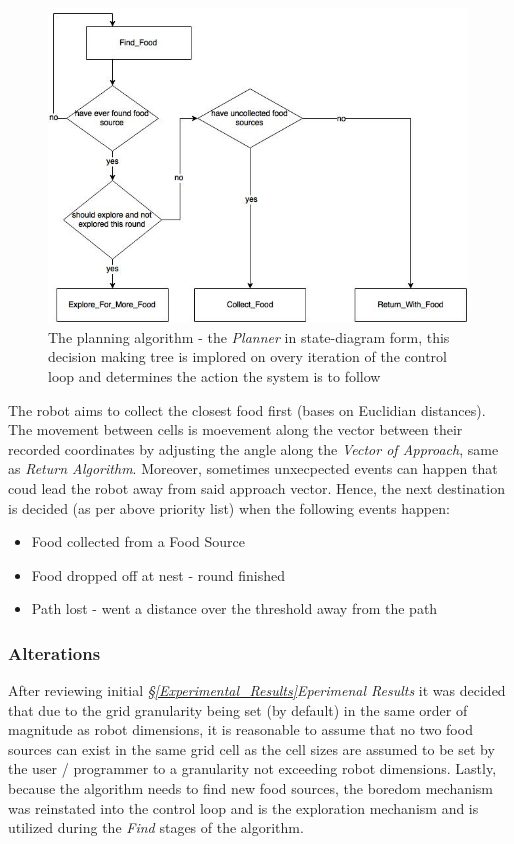 \documentclass[11pt, a4paper]{article}
\begin{document}
\begin{figure}[H]
	  \caption{The planning algorithm - the \textit{Planner} in state-diagram form, this decision making tree is implored on overy iteration of the control loop and determines the action the system is to follow}
 	  \centering
	  \includegraphics[width=30em]{../assets/fig_planner.jpg}
\end{figure} 

The robot aims to collect the closest food first (bases on Euclidian distances). The movement between cells is moevement along the vector between their recorded coordinates by adjusting the angle along the \textit{Vector of Approach}, same as \textit{Return Algorithm}\cite{task2_report}. Moreover, sometimes unxecpected events can happen that coud lead the robot away from said approach vector. Hence, the next destination is decided (as per above priority list) when the following events happen:

\begin{itemize}

	\item Food collected from a Food Source
	\item Food dropped off at nest - round finished
	\item Path lost - went a distance over the threshold away from the path

\end{itemize}

\subsubsection{Alterations}
\label{Planner_Algorithm_Alterations}

After reviewing initial \textit{\S\ref{Experimental_Results}Eperimenal Results} it was decided that due to the grid granularity being set (by default) in the same order of magnitude as robot dimensions, it is reasonable to assume that no two food sources can exist in the same grid cell as the cell sizes are assumed to be set by the user / programmer to a granularity not exceeding robot dimensions. Lastly, because the algorithm needs to find new food sources, the boredom mechanism \cite{task1_report} was reinstated into the control loop and is the exploration mechanism and is utilized during the \textit{Find} stages of the algorithm. 
\end{document}
